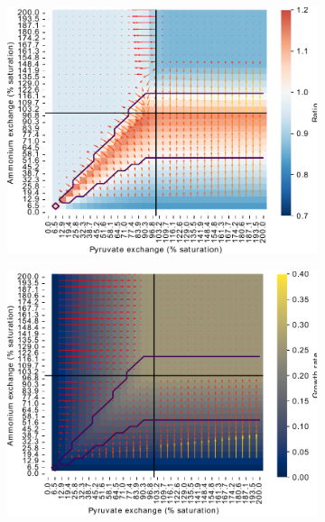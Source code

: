 \begin{figure}
  \centering
  \begin{subfigure}[t]{0.45\textwidth}
  \centering
    \includegraphics[width=\linewidth]{ec_grid_pyr_amm_ratio}
    \caption{
    }
    \label{fig:model-grid-pyr-ratio}
  \end{subfigure}%
  \begin{subfigure}[t]{0.45\textwidth}
  \centering
    \includegraphics[width=\linewidth]{ec_grid_pyr_amm_gr}
    \caption{
    }
    \label{fig:model-grid-pyr-growthrate}
  \end{subfigure}


\end{figure}

